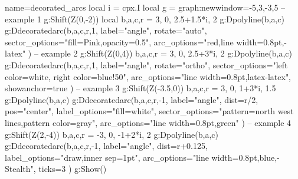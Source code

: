 \documentclass{standalone}
\begin{document}
\begin{luadraw}{name=decorated_arcs}
local i = cpx.I
local g = graph:new{window={-5,3,-3,5}}
-- example 1
g:Shift(Z(0,-2))    
local b,a,c,r = 3, 0, 2.5+1.5*i, 2
g:Dpolyline({b,a,c})
g:Ddecoratedarc(b,a,c,r,1,
    {label="angle", rotate="auto", 
    sector_options="fill=Pink,opacity=0.5", 
    arc_options="red,line width=0.8pt,-latex"
    })
-- example 2    
g:Shift(Z(0,4))    
b,a,c,r = 3, 0, 2.5+3*i, 2    
g:Dpolyline({b,a,c})
g:Ddecoratedarc(b,a,c,r,1,
    {label="angle", rotate="ortho", 
    sector_options="left color=white, right color=blue!50", 
    arc_options="line width=0.8pt,latex-latex",
    showanchor=true
    })   
-- example 3     
g:Shift(Z(-3.5,0))       
b,a,c,r = 3, 0, 1+3*i, 1.5    
g:Dpolyline({b,a,c})
g:Ddecoratedarc(b,a,c,r,-1,
    {label="angle", dist=r/2, pos="center",
    label_options="fill=white",
    sector_options="pattern=north west lines,pattern color=gray", 
    arc_options="line width=0.8pt,green"
    })
-- example 4
g:Shift(Z(2,-4))        
b,a,c,r = -3, 0, -1+2*i, 2    
g:Dpolyline({b,a,c})
g:Ddecoratedarc(b,a,c,r,-1,
    {label="angle", dist=r+0.125, 
    label_options="draw,inner sep=1pt",
    arc_options="line width=0.8pt,blue,-Stealth",
    ticks=3
    })      
g:Show()
\end{luadraw}
\end{document}
